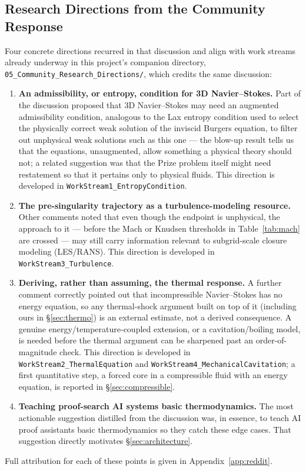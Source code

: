 \documentclass[11pt,a4paper]{article}
\begin{document}
\subsection{Research Directions from the Community Response}

Four concrete directions recurred in that discussion and align with work streams already underway
in this project's companion directory, \texttt{05\_Community\_Research\_Directions/}, which credits
the same discussion:

\begin{enumerate}
  \item \textbf{An admissibility, or entropy, condition for 3D Navier--Stokes.} Part of the
        discussion proposed that 3D Navier--Stokes may need an augmented admissibility condition,
        analogous to the Lax entropy condition used to select the physically correct weak solution
        of the inviscid Burgers equation, to filter out unphysical weak solutions such as this one
        --- the blow-up result tells us that the equations, unaugmented, allow something a physical
        theory should not; a related suggestion was that the Prize problem itself might need
        restatement so that it pertains only to physical fluids. This direction is developed in
        \texttt{WorkStream1\_EntropyCondition}.
  \item \textbf{The pre-singularity trajectory as a turbulence-modeling resource.} Other comments
        noted that even though the endpoint is unphysical, the approach to it --- before the Mach
        or Knudsen thresholds in Table~\ref{tab:mach} are crossed --- may still carry information
        relevant to subgrid-scale closure modeling (LES/RANS). This direction is developed in
        \texttt{WorkStream3\_Turbulence}.
  \item \textbf{Deriving, rather than assuming, the thermal response.} A further comment correctly
        pointed out that incompressible Navier--Stokes has no energy equation, so any thermal-shock
        argument built on top of it (including ours in \S\ref{sec:thermo}) is an external estimate,
        not a derived consequence. A genuine energy/temperature-coupled extension, or a
        cavitation/boiling model, is needed before the thermal argument can be sharpened past an
        order-of-magnitude check. This direction is developed in \texttt{WorkStream2\_ThermalEquation}
        and \texttt{WorkStream4\_MechanicalCavitation}; a first quantitative step, a forced core in a
        compressible fluid with an energy equation, is reported in \S\ref{sec:compressible}.
  \item \textbf{Teaching proof-search AI systems basic thermodynamics.} The most actionable
        suggestion distilled from the discussion was, in essence, to teach AI proof assistants
        basic thermodynamics so they catch these edge cases. That suggestion directly motivates
        \S\ref{sec:architecture}.
\end{enumerate}
Full attribution for each of these points is given in Appendix~\ref{app:reddit}.
\end{document}
